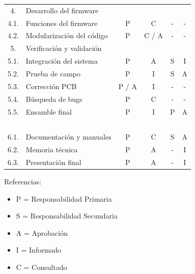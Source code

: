\documentclass[11pt]{charter}
\begin{document}
\begin{table}[H]
{\begin{tabular}{|c|l|c|c|c|c|}
 \rowcolor[HTML]{FFD200}
 4. &
 \multicolumn{5}{|l|}{Desarrollo del firmware}\\ \cline{1-6}
 
 4.1. &Funciones del firmware  & P & C & - & - \\ \hline
 4.2. &Modularización del código & P & C / A  & - & - \\ \hline
 
 \rowcolor[HTML]{00FF00}
 5. &
 \multicolumn{5}{|l|}{Verificación y validación}\\ \cline{1-6}
 
 5.1. &Integración del sistema  & P & A  & S  & I \\ \hline
 5.2. &Prueba de campo  & P & I & S & A  \\ \hline
 5.3. &Corrección PCB  & P / A & I & - & - \\ \hline
 5.4. &Búsqueda de bugs  & P & C & - & - \\ \hline
 5.5. &Ensamble final  & P & I & P & A \\ \hline
 
 \rowcolor[HTML]{800080}
 \textcolor{white}{6. } &
 \multicolumn{5}{|l|}{\textcolor{white}{Proceso de cierre }}	\\ \cline{1-6} 
 
 6.1. &Documentación y manuales  & P & C & S & A \\ \hline
 6.2. &Memoria técnica  & P & A & - & I \\ \hline
 6.3. &Presentación final  & P & A & - & I \\ \hline    


\end{tabular}%
}
\end{table}

{\footnotesize
Referencias:
\begin{itemize}
	\item P = Responsabilidad Primaria
	\item S = Responsabilidad Secundaria
	\item A = Aprobación
	\item I = Informado
	\item C = Consultado
\end{itemize}
} %


\end{document}
